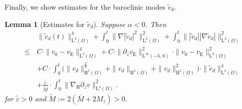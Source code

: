 \documentclass[preprint]{elsarticle}
\newtheorem{lem}[lem]{Lemma}
\numberwithin{equation}{section}
\renewcommand{\H}{\mathrm{H}}
\newcommand{\dk}[1]{\partial_{#1}}
\newcommand{\dz}{\dk{z}}
\renewcommand{\bar}[1]{\overline{#1}}
\newcommand{\vtilde}{\tilde{v}}
\newcommand{\nablaH}{\nabla_{\H}}
\newcommand{\rL}{\mathrm{L}}
\newcommand{\rH}{\H}
\newcommand{\rE}{\mathrm{E}}
\begin{document}
Finally, we show estimates for the baroclinic modes $\vtilde_d$.

\begin{lem}[Estimates for $\vtilde_d$]\label{lem:estimate vtilde_2}
	Suppose $\alpha < 0$. %
	Then %
	\begin{equation*}
		\begin{aligned}
			&\| \vtilde_d(t) \|_{\rL^4(\Omega)}^4 
			+ \int_0^t \| \nabla |\vtilde_d|^2 \|_{\rL^2(\Omega)}^2
			+ \int_0^t \| |\vtilde_d| |\nabla \vtilde_d| \|_{\rL^2(\Omega)}^2 \\
			\leq \, & C \cdot \| v_0-v_{\rE} \|_{\rL^4(\Omega)}^4
			+ C \cdot 
			\| \dz v_{\rE} \|_{\rL^\infty(-h,0)}^2 \cdot \| v_0 - v_{\rE} \|_{\rL^2(\Omega)}^2 \\
			&+ C \cdot \int_0^t \bigl( \| v_d \|_{\rH^1(\Omega)}^{\frac{2}{3}} + \| v_d \|_{\rH^1(\Omega)}+\| v_d \|_{\rH^1(\Omega)}^2 \bigr) 
			\cdot \| \vtilde_d \|_{\rL^4(\Omega)}^4  \\
			&+ \frac{\tilde{\varepsilon}}{\tilde{M}} \cdot \int_0^t \| \nablaH \partial_z v \|_{\rL^2(\Omega)}^2 . 
		\end{aligned}
	\end{equation*}
	for $\tilde{\varepsilon} > 0$ and $\tilde{M} := 2(\bar{M}+2 M_z) > 0$.
\end{lem}
\end{document}
